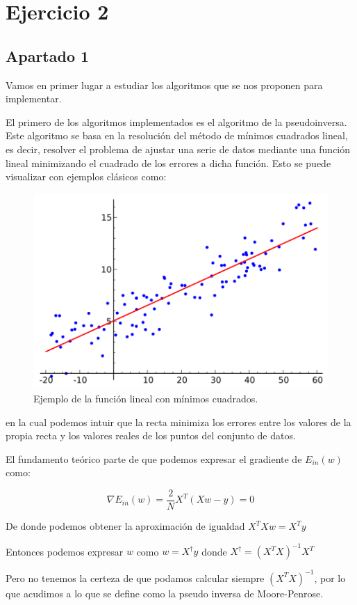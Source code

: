 \documentclass[12pt,a4paper]{article}
\begin{document}
\section{Ejercicio 2}
\subsection{Apartado 1}
Vamos en primer lugar a estudiar los algoritmos que se nos proponen para implementar.

El primero de los algoritmos implementados es el algoritmo de la pseudoinversa. Este algoritmo se basa en la resolución del método de mínimos cuadrados lineal, es decir, resolver el problema de ajustar una serie de datos mediante una función lineal minimizando el cuadrado de los errores a dicha función. Esto se puede visualizar con ejemplos clásicos como:

\begin{figure}[H]
	\centering
	\includegraphics[scale=0.7]{./Imagenes/ej2-1.png}
	\caption{Ejemplo de la función lineal con mínimos cuadrados.}
	\label{ej2-1}
\end{figure}

en la cual podemos intuir que la recta minimiza los errores entre los valores de la propia recta y los valores reales de los puntos del conjunto de datos.

El fundamento teórico parte de que podemos expresar el gradiente de $E_{in}(w)$ como:

$$\nabla E_{in}(w) = \frac{2}{N}X^T (Xw - y) = 0$$

De donde podemos obtener la aproximación de igualdad $X^T X w = X^T y$

Entonces podemos expresar $w$ como $w = X^{\dagger}y$ donde $X^{\dagger} = (X^T X)^{-1}X^T$

Pero no tenemos la certeza de que podamos calcular siempre $(X^T X)^{-1}$, por lo que acudimos a lo que se define como la pseudo inversa de Moore-Penrose.
\end{document}
